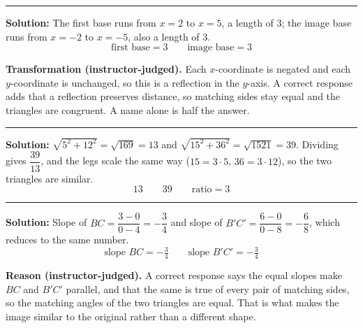 \documentclass[12pt]{article}
\begin{document}
\vspace{0.2cm}

\noindent\rule{\linewidth}{0.2pt}


\textbf{Solution:} \quad The first base runs from $x = 2$ to $x = 5$, a length of $3$; the image
base runs from $x = -2$ to $x = -5$, also a length of $3$.
\[ \boxed{\text{first base} = 3 \qquad \text{image base} = 3} \]

\textbf{Transformation (instructor-judged).} Each $x$-coordinate is negated and each
$y$-coordinate is unchanged, so this is a reflection in the $y$-axis. A correct response adds
that a reflection preserves distance, so matching sides stay equal and the triangles are
congruent. A name alone is half the answer.

\vspace{0.2cm}

\noindent\rule{\linewidth}{0.2pt}


\textbf{Solution:} \quad $\sqrt{5^2 + 12^2} = \sqrt{169} = 13$ and
$\sqrt{15^2 + 36^2} = \sqrt{1521} = 39$. Dividing gives $\dfrac{39}{13}$, and the legs scale the
same way ($15 = 3 \cdot 5$, $36 = 3 \cdot 12$), so the two triangles are similar.
\[ \boxed{13 \qquad 39 \qquad \text{ratio} = 3} \]

\vspace{0.2cm}

\noindent\rule{\linewidth}{0.2pt}


\textbf{Solution:} \quad Slope of $BC = \dfrac{3-0}{0-4} = -\dfrac{3}{4}$ and slope of
$B'C' = \dfrac{6-0}{0-8} = -\dfrac{6}{8}$, which reduces to the same number.
\[ \boxed{\text{slope } BC = -\tfrac{3}{4} \qquad \text{slope } B'C' = -\tfrac{3}{4}} \]

\textbf{Reason (instructor-judged).} A correct response says the equal slopes make $BC$ and
$B'C'$ parallel, and that the same is true of every pair of matching sides, so the matching
angles of the two triangles are equal. That is what makes the image similar to the original
rather than a different shape.

\vspace{0.2cm}
\end{document}
